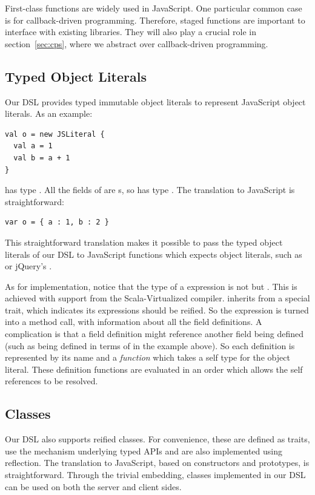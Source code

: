 \documentclass[runningheads,a4paper]{llncs}
\begin{document}
First-class functions are widely used in JavaScript. One particular
common case is for callback-driven programming. Therefore, staged
functions are important to interface with existing libraries. They
will also play a crucial role in section~\ref{sec:cps}, where we
abstract over callback-driven programming.

\subsection{Typed Object Literals}\label{sec:object-literals}

Our DSL provides typed immutable object literals to represent
JavaScript object literals. As an example:
\begin{lstlisting}
val o = new JSLiteral {
  val a = 1
  val b = a + 1
}
\end{lstlisting}
 has type . All
the fields of  are s, so  has type
. The translation to JavaScript is straightforward:
\begin{lstlisting}
var o = { a : 1, b : 2 }
\end{lstlisting}
This straightforward translation makes it possible to pass the typed
object literals of our DSL to JavaScript functions which expects
object literals, such as  or jQuery's .

As for implementation, notice that the type of a  expression is not  but
. This is achieved with support from the
Scala-Virtualized compiler.  inherits from a special
trait, which indicates its  expressions should be
reified. So the  expression is turned into a method call,
with information about all the field definitions. A complication is
that a field definition might reference another field being defined
(such as  being defined in terms of  in the example
above). So each definition is represented by its name and a {\it
  function} which takes a self type for the object literal. These
definition functions are evaluated in an order which allows the self
references to be resolved.

\subsection{Classes}\label{sec:reified-classes}
Our DSL also supports reified classes. For convenience, these are
defined as traits, use the  mechanism underlying typed
APIs and are also implemented using reflection. The translation to
JavaScript, based on constructors and prototypes, is
straightforward. Through the trivial embedding, classes implemented in
our DSL can be used on both the server and client sides.
\end{document}
